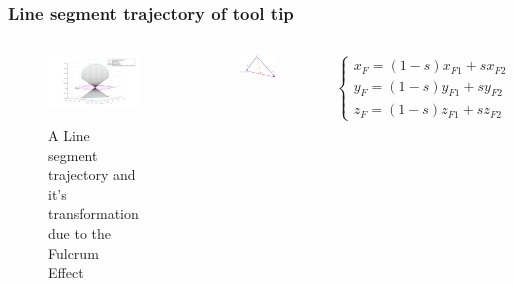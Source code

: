 \begin{frame}
\frametitle{Line segment trajectory of tool tip}

\begin{columns}
\begin{center}
\begin{figure}[!htb]
\centering
\includegraphics[width=\textwidth]{../images/rcm_trajectories/rcm_lineseg_traj.png}\\
\caption{A Line segment trajectory and it's transformation due to the Fulcrum Effect}
\end{figure}
\end{center}

\begin{center}
\begin{figure}[!htb]
\centering
\includegraphics[width=\textwidth]{../images/line-segment-trajectory-wrt-fulcrum.png}\\
\end{figure}
\end{center}
\[
\begin{cases}
x^{}_{F} = (1-s)x^{}_{F1} + sx^{}_{F2} \\
y^{}_{F} = (1-s)y^{}_{F1} + sy^{}_{F2} \\
z^{}_{F} = (1-s)z^{}_{F1} + sz^{}_{F2}
\end{cases}
\]

\end{columns}
\end{frame}


